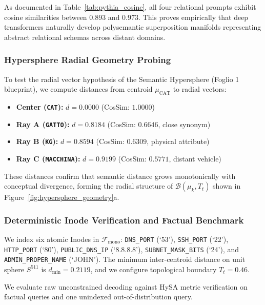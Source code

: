 \documentclass[11pt,a4paper]{article}
\theoremstyle{definition}
\begin{document}
As documented in Table~\ref{tab:pythia_cosine}, all four relational prompts exhibit cosine similarities between $\mathbf{0.893}$ and $\mathbf{0.973}$. This proves empirically that deep transformers naturally develop polysemantic superposition manifolds representing abstract relational schemas across distant domains.

\subsubsection{Hypersphere Radial Geometry Probing}
To test the radial vector hypothesis of the Semantic Hypersphere (Foglio 1 blueprint), we compute distances from centroid $\mu_{\mathrm{CAT}}$ to radial vectors:
\begin{itemize}[leftmargin=*, itemsep=1.0pt]
    \item \textbf{Center (\texttt{CAT}):} $d = 0.0000$ (CosSim: $1.0000$)
    \item \textbf{Ray A (\texttt{GATTO}):} $d = 0.8184$ (CosSim: $0.6646$, close synonym)
    \item \textbf{Ray B (\texttt{KG}):} $d = 0.8594$ (CosSim: $0.6309$, physical attribute)
    \item \textbf{Ray C (\texttt{MACCHINA}):} $d = 0.9199$ (CosSim: $0.5771$, distant vehicle)
\end{itemize}
These distances confirm that semantic distance grows monotonically with conceptual divergence, forming the radial structure of $\mathcal{B}(\mu_k, T_t)$ shown in Figure~\ref{fig:hypersphere_geometry}a.

\subsubsection{Deterministic Inode Verification and Factual Benchmark}
We index six atomic Inodes in $\mathcal{F}_{\mathrm{mono}}$: \texttt{DNS\_PORT} (`53'), \texttt{SSH\_PORT} (`22'), \texttt{HTTP\_PORT} (`80'), \texttt{PUBLIC\_DNS\_IP} (`8.8.8.8'), \texttt{SUBNET\_MASK\_BITS} (`24'), and \texttt{ADMIN\_PROPER\_NAME} (`JOHN'). The minimum inter-centroid distance on unit sphere $S^{511}$ is $d_{\min} = 0.2119$, and we configure topological boundary $T_t = 0.46$.

We evaluate raw unconstrained decoding against HySA metric verification on factual queries and one unindexed out-of-distribution query.
\end{document}
